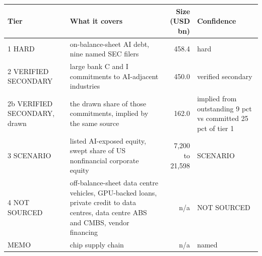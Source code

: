 \begin{tabular}{p{2.1cm}p{6.3cm}rp{3.1cm}}
\toprule
Tier & What it covers & Size (USD bn) & Confidence \\
\midrule
1 HARD & on-balance-sheet AI debt, nine named SEC filers & 458.4 & hard \\
2 VERIFIED SECONDARY & large bank C and I commitments to AI-adjacent industries & 450.0 & verified secondary \\
2b VERIFIED SECONDARY, drawn & the drawn share of those commitments, implied by the same source & 162.0 & implied from outstanding 9 pct vs committed 25 pct of tier 1 \\
3 SCENARIO & listed AI-exposed equity, swept share of US nonfinancial corporate equity & 7,200 to 21,598 & SCENARIO \\
4 NOT SOURCED & off-balance-sheet data centre vehicles, GPU-backed loans, private credit to data centres, data centre ABS and CMBS, vendor financing & n/a & NOT SOURCED \\
MEMO & chip supply chain & n/a & named \\
\bottomrule
\end{tabular}
